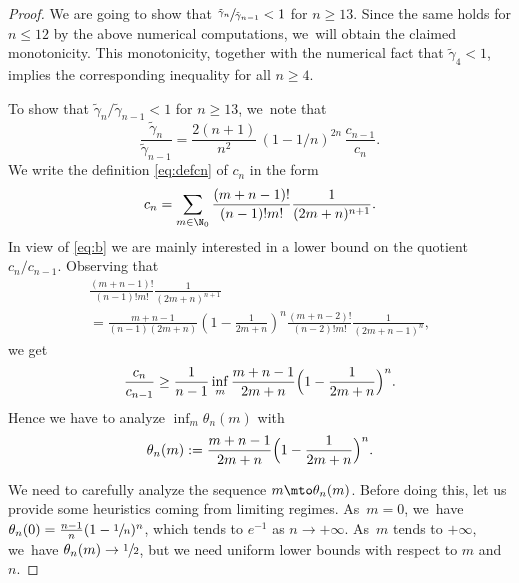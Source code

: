 \begin{proof}
We are going to show that $\sfrac{\tilde\gamma_n}{\tilde\gamma_{n-1}}<1$ for $n\geq 13$. Since the same holds for $n\leq 12$ by the above numerical computations, we~will obtain the claimed monotonicity. This monotonicity, together with the numerical fact that $\tilde\gamma_4<1$, implies the corresponding inequality for all $n\geq 4$.

To show that $\tilde\gamma_n/\tilde\gamma_{n-1} <1$ for $n\geq 13$, we~note that
\begin{equation} \label{eq:b}
\frac{\tilde\gamma_n}{\tilde\gamma_{n-1}} = \frac{2(n+1)}{n^2} \,(1-1/n)^{2n} \,\frac{c_{n-1}}{c_n}.
\end{equation}
We write the definition \eqref{eq:defcn} of $c_n$ in the form
\[
c_n= \sum_{m\in\N_0} \frac{ (m+n-1)! }{(n-1)! m!} \frac{1}{(2m+n)^{n+1}}.
\]
In view of \eqref{eq:b} we are mainly interested in a lower bound on the quotient $c_n/c_{n-1}$. Observing that
\begin{multline*}
\frac{ (m+n-1)! }{(n-1)! m!} \frac{1}{(2m+n)^{n+1}}\\
= \frac{m+n-1}{(n-1)(2m+n)} (1- \frac{1}{2m+n})^n \frac{ (m+n-2)! }{(n-2)! m!} \frac{1}{(2m+n-1)^{n}},
\end{multline*}
we get
\begin{equation}\label{eq:a}
\frac{c_n}{c_{n-1}} \geq \frac{1}{n-1} \inf_m \frac{m+n-1}{2m+n} \Bigl(1- \frac{1}{2m+n}\Bigr)^n.
\end{equation}
Hence we have to analyze $\inf_m \theta_n(m)$ with
\begin{equation}\label{eq:theta}
\theta_n(m):= \frac{m+n-1}{2m+n} \Bigl(1- \frac{1}{2m+n}\Bigr)^n.
\end{equation}

We need to carefully analyze the sequence $m \mto \theta_n(m)$. Before doing this, let us provide some heuristics coming from limiting regimes. As~$m=0$, we~have \hbox{$\theta_n(0)=\frac{n-1}{n}(1- \sfrac{1}{n})^n$}, which tends to $e^{-1}$ as $n\to +\infty$. As~$m$ tends to $+\infty$, we~have $\theta_n(m)\to\nobreak\sfrac 12$, but we need uniform lower bounds with respect to $m$ and $n$.


\end{proof}
